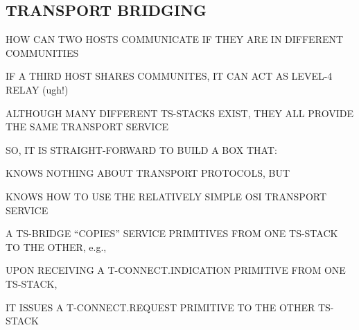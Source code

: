 \begin{bwslide}
\part*	{TRANSPORT BRIDGING}\bf

\begin{nrtc}
\item	HOW CAN TWO HOSTS COMMUNICATE IF THEY ARE IN DIFFERENT COMMUNITIES

\item	IF A THIRD HOST SHARES COMMUNITES, IT CAN ACT AS LEVEL-4 RELAY (ugh!)
\end{nrtc}
\end{bwslide}


\begin{bwslide}

\begin{nrtc}
\item	ALTHOUGH MANY DIFFERENT TS-STACKS EXIST,
	THEY ALL PROVIDE THE SAME TRANSPORT SERVICE

\item	SO, IT IS STRAIGHT-FORWARD TO BUILD A BOX THAT:
    \begin{nrtc}
    \item	KNOWS NOTHING ABOUT TRANSPORT PROTOCOLS, BUT

    \item	KNOWS HOW TO USE THE RELATIVELY SIMPLE OSI TRANSPORT SERVICE
    \end{nrtc}

\item	A TS-BRIDGE ``COPIES'' SERVICE PRIMITIVES FROM ONE TS-STACK TO THE
	OTHER, e.g.,
    \begin{nrtc}
    \item	UPON RECEIVING A T-CONNECT.INDICATION PRIMITIVE FROM ONE
		TS-STACK,

    \item	IT ISSUES A T-CONNECT.REQUEST PRIMITIVE TO THE OTHER TS-STACK
    \end{nrtc}
\end{nrtc}
\end{bwslide}




